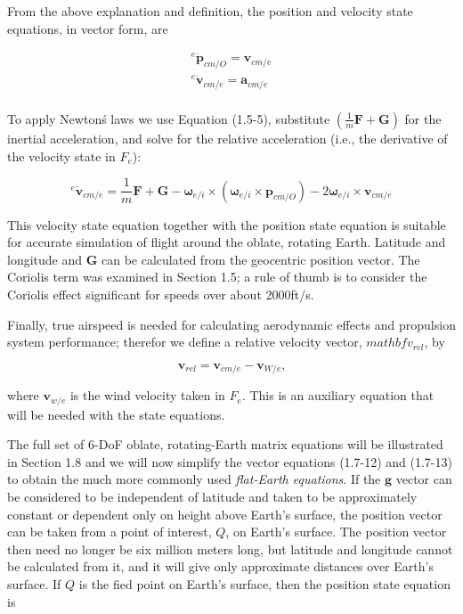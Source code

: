 From the above explanation and definition, the position and velocity state equations, in vector form, are

\begin{align*}\tag{1.7-12}
    {^{e}{\dot{\mathbf{p}}}_{cm/O}} = \mathbf{v}_{cm/e} \\
    {^{e}{\dot{\mathbf{v}}}_{cm/e}} = \mathbf{a}_{cm/e} \\
\end{align*}

To apply Newton\'s laws we use Equation (1.5-5), substitute \(\left( \textstyle{\frac{1}{m}}\mathbf{F} + \mathbf{G}\right)\) for the inertial acceleration, and solve for the relative acceleration (i.e., the derivative of the velocity state in \(F_{e}\)):

\begin{equation*}\tag{1.7-13}
    {^{e}{\dot{\mathbf{v}}_{cm/e}}} = \textstyle{\frac{1}{m}} \mathbf{F} + \mathbf{G} - \mathbf{\omega}_{e/i} \times \left( \mathbf{\omega}_{e/i} \times \mathbf{p}_{cm/O} \right) - 2 \mathbf{\omega}_{e/i} \times \mathbf{v}_{cm/e}
\end{equation*}

This velocity state equation together with the position state equation is suitable for accurate simulation of flight around the oblate, rotating Earth. Latitude and longitude and \(\mathbf{G}\) can be calculated from the geocentric position vector. The Coriolis term was examined in Section 1.5; a rule of thumb is to consider the Coriolis effect significant for speeds over about 2000ft/s.

Finally, true airspeed is needed for calculating aerodynamic effects and propulsion system performance; therefor we define a relative velocity vector, \(mathbf{v}_{rel}\), by

\begin{equation*}\tag{1.7-14}
    \mathbf{v}_{rel} = \mathbf{v}_{cm/e} - \mathbf{v}_{W/e} \text{,}
\end{equation*}

where \(\mathbf{v}_{w/e}\) is the wind velocity taken in \(F_{e}\). This is an auxiliary equation that will be needed with the state equations.

The full set of 6-DoF oblate, rotating-Earth matrix equations will be illustrated in Section 1.8 and we will now simplify the vector equations (1.7-12) and (1.7-13) to obtain the much more commonly used \emph{flat-Earth equations}. If the \(\mathbf{g}\) vector can be considered to be independent of latitude and taken to be approximately constant or dependent only on height above Earth's surface, the position vector can be taken from a point of interest, \(Q\), on Earth's surface. The position vector then need no longer be six million meters long, but latitude and longitude cannot be calculated from it, and it will give only approximate distances over Earth's surface. If \(Q\) is the fied point on Earth's surface, then the position state equation is

